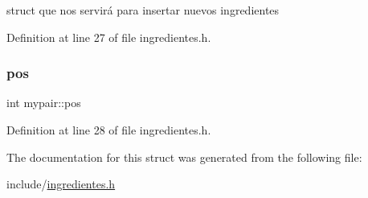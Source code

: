 struct que nos servirá para insertar nuevos ingredientes 

Definition at line 27 of file ingredientes.\+h.

\mbox{\label{structmypair_a3cfe391d3fe21767719a321dfac81fad}} 
\subsubsection{\texorpdfstring{pos}{pos}}
{\footnotesize\ttfamily int mypair\+::pos}



Definition at line 28 of file ingredientes.\+h.



The documentation for this struct was generated from the following file\+:\begin{DoxyCompactItemize}
\item 
include/\hyperlink{ingredientes_8h}{ingredientes.\+h}\end{DoxyCompactItemize}
